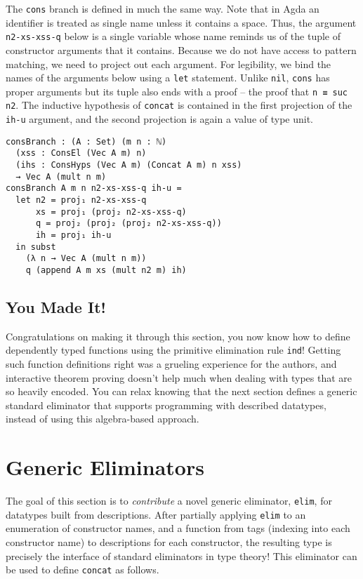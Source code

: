\documentclass[nonatbib]{sigplanconf}
\begin{document}
The {\tt cons} branch is defined in much the same way. Note
that in {\sc Agda} an identifier is treated as single name unless it
contains a space. Thus, the argument {\tt n2-xs-xss-q} below is a
single variable whose name reminds us of the tuple of constructor
arguments that it contains. Because we do not have access to pattern
matching, we need to project out each argument. For legibility, we
bind the names of the arguments below using a {\tt let} statement.
Unlike {\tt nil}, {\tt cons} has proper arguments but its tuple also
ends with a proof -- the proof that {\tt n ≡ suc n2}. The inductive
hypothesis of {\tt concat} is contained in the first projection of the
{\tt ih-u} argument, and the second projection is again a value of
type unit.

\begin{verbatim}
consBranch : (A : Set) (m n : ℕ)
  (xss : ConsEl (Vec A m) n)
  (ihs : ConsHyps (Vec A m) (Concat A m) n xss)
  → Vec A (mult n m)
consBranch A m n n2-xs-xss-q ih-u =
  let n2 = proj₁ n2-xs-xss-q
      xs = proj₁ (proj₂ n2-xs-xss-q)
      q = proj₂ (proj₂ (proj₂ n2-xs-xss-q))
      ih = proj₁ ih-u
  in subst
    (λ n → Vec A (mult n m))
    q (append A m xs (mult n2 m) ih)
\end{verbatim}

\subsection{You Made It!}

Congratulations on making it through this section, you now know how to define dependently typed
functions using the primitive elimination rule {\tt ind}!
Getting such function definitions right was a grueling experience for
the authors, and interactive theorem proving doesn't help much when
dealing with types that are so heavily encoded. You can relax knowing
that the next section defines a generic standard eliminator that supports
programming with described datatypes, instead of using this
algebra-based approach.

\section{Generic Eliminators}
\label{sec:elim}

The goal of this section is to {\it contribute} a novel generic
eliminator, {\tt elim}, for datatypes built from descriptions.
After partially applying {\tt elim} to an enumeration of constructor
names, and a function from tags (indexing into each constructor name)
to descriptions for each constructor, the resulting type is precisely
the interface of standard eliminators in type theory!  This eliminator can
be used to define {\tt concat} as follows.
\end{document}
